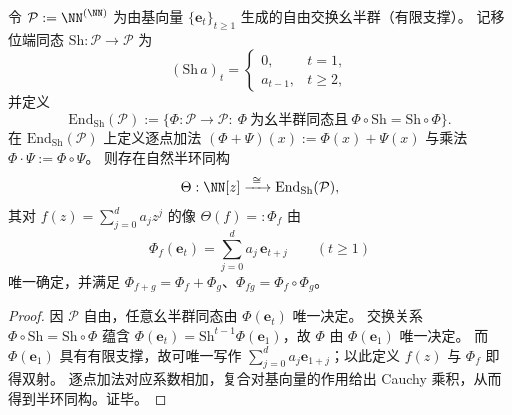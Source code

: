 
\begin{theorem}[移位可交换算法的多项式半环刻画]\label{thm:conclusion-shift-commuting-algorithms-polynomial}
令 \(\mathcal P:=\NN^{(\NN)}\) 为由基向量 \(\{\mathbf e_t\}_{t\ge 1}\) 生成的自由交换幺半群（有限支撑）。
记移位端同态 \(\mathrm{Sh}:\mathcal P\to\mathcal P\) 为
\[
(\mathrm{Sh}\,a)_t=
\begin{cases}
0,&t=1,\\
a_{t-1},&t\ge 2,
\end{cases}
\]
并定义
\[
\mathrm{End}_{\mathrm{Sh}}(\mathcal P):=\{\Phi:\mathcal P\to\mathcal P:\ \Phi\ \text{为幺半群同态且}\ \Phi\circ\mathrm{Sh}=\mathrm{Sh}\circ\Phi\}.
\]
在 \(\mathrm{End}_{\mathrm{Sh}}(\mathcal P)\) 上定义逐点加法 \((\Phi+\Psi)(x):=\Phi(x)+\Psi(x)\) 与乘法 \(\Phi\cdot\Psi:=\Phi\circ\Psi\)。
则存在自然半环同构
\[
\Theta:\NN[z]\xrightarrow{\ \cong\ }\mathrm{End}_{\mathrm{Sh}}(\mathcal P),
\]
其对 \(f(z)=\sum_{j=0}^{d}a_j z^j\) 的像 \(\Theta(f)=:\Phi_f\) 由
\[
\Phi_f(\mathbf e_t)=\sum_{j=0}^{d}a_j\,\mathbf e_{t+j}\qquad(t\ge 1)
\]
唯一确定，并满足 \(\Phi_{f+g}=\Phi_f+\Phi_g\)、\(\Phi_{fg}=\Phi_f\circ\Phi_g\)。
\end{theorem}
\begin{proof}
因 \(\mathcal P\) 自由，任意幺半群同态由 \(\Phi(\mathbf e_t)\) 唯一决定。
交换关系 \(\Phi\circ\mathrm{Sh}=\mathrm{Sh}\circ\Phi\) 蕴含 \(\Phi(\mathbf e_t)=\mathrm{Sh}^{t-1}\Phi(\mathbf e_1)\)，故 \(\Phi\) 由 \(\Phi(\mathbf e_1)\) 唯一决定。
而 \(\Phi(\mathbf e_1)\) 具有有限支撑，故可唯一写作 \(\sum_{j=0}^d a_j \mathbf e_{1+j}\)；以此定义 \(f(z)\) 与 \(\Phi_f\) 即得双射。
逐点加法对应系数相加，复合对基向量的作用给出 Cauchy 乘积，从而得到半环同构。证毕。
\end{proof}




